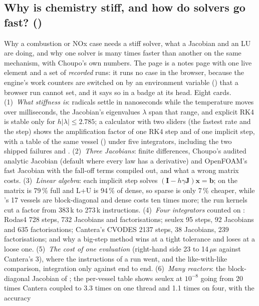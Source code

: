 \documentclass[11pt,a4paper]{article}
\begin{document}
\subsection*{Why is chemistry stiff, and how do solvers go fast? \quad()}\label{sec:edu-stiff-chemistry}
Why a combustion or NOx case needs a stiff solver, what a Jacobian and an LU
are doing, and why one solver is many times faster than another on the same
mechanism, with Choupo's own numbers.  The page is a notes page with one live
element and a set of \emph{recorded} runs: it runs no case in the browser,
because the engine's work counters are switched on by an environment variable
() that a browser run cannot set, and it says so in
a badge at its head.  Eight cards.  (1)~\emph{What stiffness is}: radicals
settle in nanoseconds while the temperature moves over milliseconds, the
Jacobian's eigenvalues $\lambda$ span that range, and explicit RK4 is stable
only for $h|\lambda|\le 2.785$; a calculator with two sliders (the fastest
rate and the step) shows the amplification factor of one RK4 step and of one
implicit step, with a table of the same vessel
() under five integrators, including the two shipped
failures  and .
(2)~\emph{Three Jacobians}: finite differences, Choupo's audited analytic
Jacobian (default where every law has a derivative) and OpenFOAM's fast
Jacobian with the fall-off terms compiled out, and what a wrong matrix costs.
(3)~\emph{Linear algebra}: each implicit step solves
$(\mathbf{I}-h\gamma\mathbf{J})\mathbf{x}=\mathbf{b}$; on  the
matrix is 79\,\% full and L+U is 94\,\% of dense, so sparse is only 7\,\%
cheaper, while 's 17 vessels are block-diagonal and dense costs
ten times more; the run kernels cut a factor from 383\,k to 273\,k
instructions.  (4)~\emph{Four integrators} counted on :
Rodas4 728 steps, 732 Jacobians and factorisations; seulex 95 steps, 92
Jacobians and 635 factorisations; Cantera's CVODES 2137 steps, 38 Jacobians,
239 factorisations; and why a big-step method wins at a tight tolerance and
loses at a loose one.  (5)~\emph{The cost of one evaluation} (right-hand
side 23 to 14\,$\mu$s against Cantera's 3), where the instructions of a run
went, and the like-with-like comparison, integration only against end to end.
(6)~\emph{Many reactors}: the block-diagonal Jacobian of ; the
per-vessel table shows seulex at $10^{-8}$ going from 20 times Cantera
coupled to 3.3 times on one thread and 1.1 times on four, with the accuracy
\end{document}

